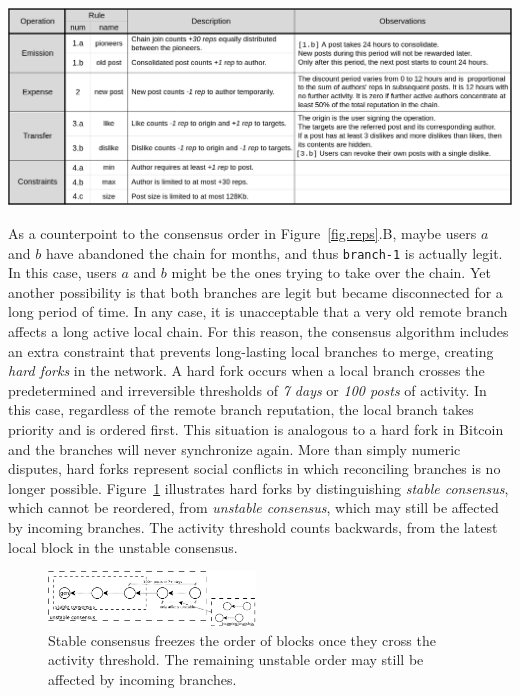 \documentclass[12pt]{article}
\newcommand{\FC}       {Freechains\xspace}
\newcommand{\code}[1]  {\texttt{\footnotesize{#1}}}
\begin{document}
\begin{table}
\centering
\includegraphics[width=\textwidth]{rules.png}
\caption{
    Reputation rules for public forum chains in \FC.
    The chosen constants ($30~reps$, $24h$, etc) are arbitrary and target
    typical Internet forums with moderate traffic.
    A future revision of the protocol could support them as chain parameters.
}
\label{fig.rules}
\end{table}

As a counterpoint to the consensus order in Figure~\ref{fig.reps}.B, maybe
users $a$ and $b$ have abandoned the chain for months, and thus \code{branch-1}
is actually legit.
In this case, users $a$ and $b$ might be the ones trying to take over the
chain.
Yet another possibility is that both branches are legit but became disconnected
for a long period of time.
In any case, it is unacceptable that a very old remote branch affects a long
active local chain.
%
For this reason, the consensus algorithm includes an extra constraint that
prevents long-lasting local branches to merge, creating \emph{hard forks} in
the network.
A hard fork occurs when a local branch crosses the predetermined and
irreversible thresholds of \emph{7 days} or \emph{100 posts} of activity.
In this case, regardless of the remote branch reputation, the local branch
takes priority and is ordered first.
This situation is analogous to a hard fork in Bitcoin and the branches will
never synchronize again.
More than simply numeric disputes, hard forks represent social conflicts in
which reconciling branches is no longer possible.
%
Figure~\ref{fig.hard} illustrates hard forks by distinguishing \emph{stable
consensus}, which cannot be reordered, from \emph{unstable consensus}, which may
still be affected by incoming branches.
The activity threshold counts backwards, from the latest local block in the
unstable consensus.

\begin{figure}
\centering
\includegraphics[width=0.49\textwidth]{n100-d7.png}
\caption{
    Stable consensus freezes the order of blocks once they cross the activity
    threshold.
    The remaining unstable order may still be affected by incoming branches.
}
\label{fig.hard}
\end{figure}
\end{document}

